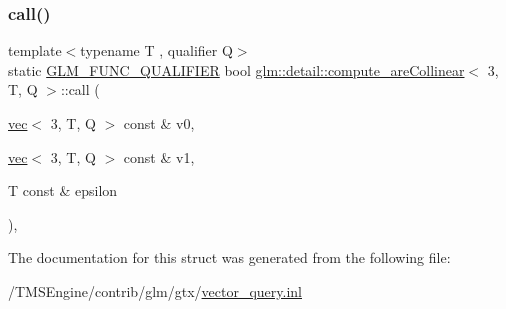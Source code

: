 \subsubsection{\texorpdfstring{call()}{call()}}
{\footnotesize\ttfamily template$<$typename T , qualifier Q$>$ \\
static \hyperlink{setup_8hpp_a33fdea6f91c5f834105f7415e2a64407}{G\+L\+M\+\_\+\+F\+U\+N\+C\+\_\+\+Q\+U\+A\+L\+I\+F\+I\+ER} bool \hyperlink{structglm_1_1detail_1_1compute__are_collinear}{glm\+::detail\+::compute\+\_\+are\+Collinear}$<$ 3, T, Q $>$\+::call (\begin{DoxyParamCaption}\item[{\hyperlink{structglm_1_1vec}{vec}$<$ 3, T, Q $>$ const \&}]{v0,  }\item[{\hyperlink{structglm_1_1vec}{vec}$<$ 3, T, Q $>$ const \&}]{v1,  }\item[{T const \&}]{epsilon }\end{DoxyParamCaption})\hspace{0.3cm}{\ttfamily [inline]}, {\ttfamily [static]}}



The documentation for this struct was generated from the following file\+:\begin{DoxyCompactItemize}
\item 
/\+T\+M\+S\+Engine/contrib/glm/gtx/\hyperlink{vector__query_8inl}{vector\+\_\+query.\+inl}\end{DoxyCompactItemize}
